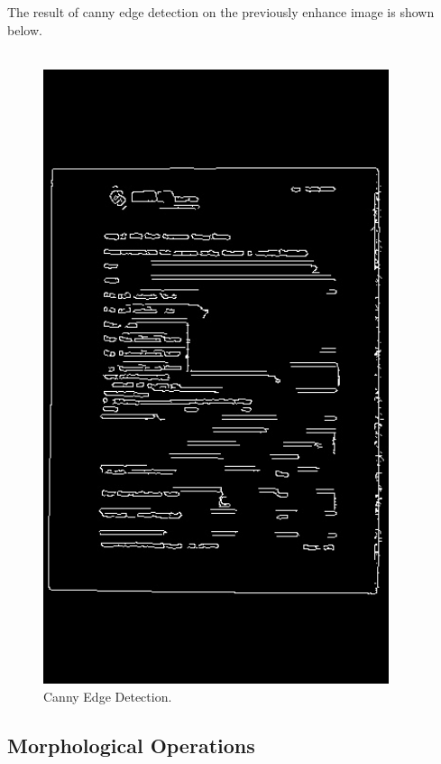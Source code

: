 \pagebreak

The result of canny edge detection on the previously enhance image is shown below. \\ \\

\begin{figure}[th]
	\centering
	\includegraphics[height=18cm ]{Figures/canny_edge_detection}
	\caption[Canny Edge Detection]{Canny Edge Detection.}
	\label{fig:CannyEdgeDetection}
\end{figure}
\pagebreak
\subsection{Morphological Operations}

